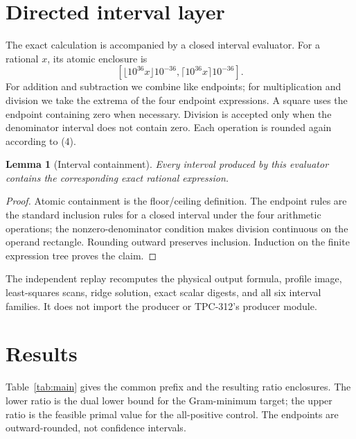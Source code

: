 \documentclass[10pt,a4paper]{article}
\newtheorem{lemma}{Lemma}
\begin{document}
\section{Directed interval layer}

The exact calculation is accompanied by a closed interval evaluator.  For a
rational $x$, its atomic enclosure is
\[
 [\lfloor 10^{36}x\rfloor10^{-36},
   \lceil 10^{36}x\rceil10^{-36}].                    \tag{4}
\]
For addition and subtraction we combine like endpoints; for multiplication
and division we take the extrema of the four endpoint expressions.  A square
uses the endpoint containing zero when necessary.  Division is accepted only
when the denominator interval does not contain zero.  Each operation is
rounded again according to (4).

\begin{lemma}[Interval containment]
Every interval produced by this evaluator contains the corresponding exact
rational expression.
\end{lemma}

\begin{proof}
Atomic containment is the floor/ceiling definition.  The endpoint rules are
the standard inclusion rules for a closed interval under the four arithmetic
operations; the nonzero-denominator condition makes division continuous on
the operand rectangle.  Rounding outward preserves inclusion.  Induction on
the finite expression tree proves the claim.
\end{proof}

The independent replay recomputes the physical output formula, profile image,
least-squares scans, ridge solution, exact scalar digests, and all six
interval families.  It does not import the producer or TPC-312's producer
module.

\section{Results}

Table~\ref{tab:main} gives the common prefix and the resulting ratio
enclosures.  The lower ratio is the dual lower bound for the Gram-minimum
target; the upper ratio is the feasible primal value for the all-positive
control.  The endpoints are outward-rounded, not confidence intervals.
\end{document}
